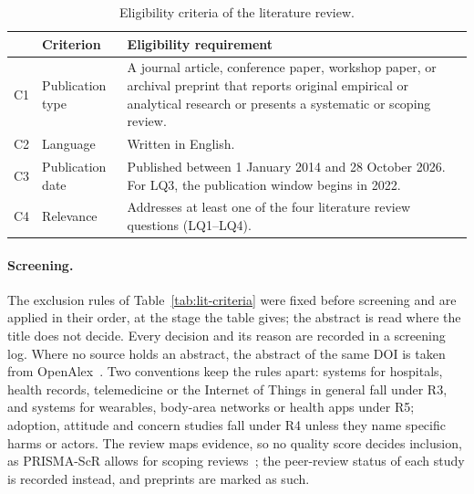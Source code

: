 \begin{table}[H]
\centering
\begin{singlespace}
\caption[Eligibility criteria of the literature review]{Eligibility criteria of
the literature review.}
\label{tab:lit-eligibility}
\small
\begin{tabularx}{\textwidth}{@{}l>{\raggedright\arraybackslash}p{2.6cm}>{\raggedright\arraybackslash}X@{}}
\toprule
 & \textbf{Criterion} & \textbf{Eligibility requirement} \\
\midrule
C1 & Publication type & A journal article, conference paper, workshop paper, or archival preprint that reports original empirical or analytical research or presents a systematic or scoping review. \\
C2 & Language & Written in English. \\
C3 & Publication date & Published between 1 January 2014 and 28 October 2026. For LQ3, the publication window begins in 2022. \\
C4 & Relevance & Addresses at least one of the four literature review questions (LQ1--LQ4). \\
\bottomrule
\end{tabularx}
\end{singlespace}
\end{table}

\paragraph{Screening.} The exclusion rules of Table~\ref{tab:lit-criteria} were
fixed before screening and are applied in their order, at the stage the table
gives; the abstract is read where the title does not decide. Every decision and
its reason are recorded in a screening log.
Where no source holds an abstract, the abstract of the same DOI is taken from
OpenAlex~\parencite{priem2022openalex}. Two conventions keep the rules apart:
systems for hospitals, health records, telemedicine or the Internet of Things
in general fall under R3, and systems for wearables, body-area networks or
health apps under R5; adoption, attitude and concern studies fall under R4
unless they name specific harms or actors. The review maps evidence, so no quality
score decides inclusion, as PRISMA-ScR allows for scoping
reviews~\parencite{tricco2018prisma}; the peer-review status of each study is
recorded instead, and preprints are marked as such.

